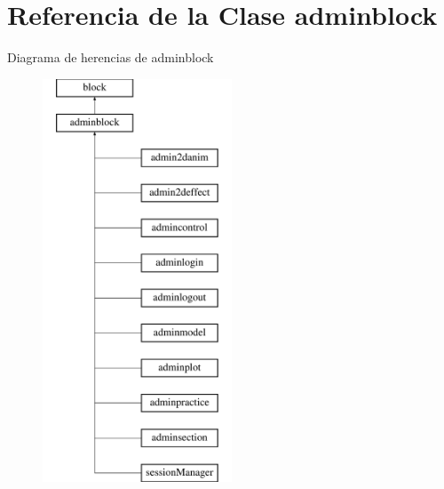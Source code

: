 \hypertarget{classadminblock}{}\section{Referencia de la Clase adminblock}
\label{classadminblock}
Diagrama de herencias de adminblock\begin{figure}[H]
\begin{center}
\leavevmode
\includegraphics[height=12.000000cm]{classadminblock}
\end{center}
\end{figure}

